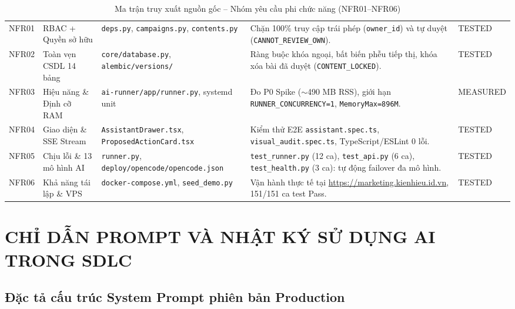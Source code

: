 \begin{table}[!htbp]
\centering
\scriptsize
\renewcommand{\arraystretch}{0.96}
\caption{Ma trận truy xuất nguồn gốc -- Nhóm yêu cầu phi chức năng (NFR01--NFR06)}\label{tab:traceability-nfr}
\begin{tabularx}{\textwidth}{|C{0.9cm}|L{2.5cm}|L{3.5cm}|Y|C{1.9cm}|}
\hline
{} &  &  &  & \\
\hline
NFR01 & RBAC + Quyền sở hữu & \texttt{deps.py}, \texttt{campaigns.py}, \texttt{contents.py} & Chặn 100\% truy cập trái phép (\texttt{owner\_id}) và tự duyệt (\texttt{CANNOT\_REVIEW\_OWN}). & TESTED\\
\hline
NFR02 & Toàn vẹn CSDL 14 bảng & \texttt{core/database.py}, \texttt{alembic/versions/} & Ràng buộc khóa ngoại, bất biến phễu tiếp thị, khóa xóa bài đã duyệt (\texttt{CONTENT\_LOCKED}). & TESTED\\
\hline
NFR03 & Hiệu năng \& Định cỡ RAM & \texttt{ai-runner/app/runner.py}, systemd unit & Đo P0 Spike ($\sim$490 MB RSS), giới hạn \texttt{RUNNER\_CONCURRENCY=1}, \texttt{MemoryMax=896M}. & MEASURED\\
\hline
NFR04 & Giao diện \& SSE Stream & \texttt{AssistantDrawer.tsx}, \texttt{ProposedActionCard.tsx} & Kiểm thử E2E \texttt{assistant.spec.ts}, \texttt{visual\_audit.spec.ts}, TypeScript/ESLint 0 lỗi. & TESTED\\
\hline
NFR05 & Chịu lỗi \& 13 mô hình AI & \texttt{runner.py}, \texttt{deploy/opencode/}\allowbreak\texttt{opencode.json} & \texttt{test\_runner.py} (12 ca), \texttt{test\_api.py} (6 ca), \texttt{test\_health.py} (3 ca): tự động failover đa mô hình. & TESTED\\
\hline
NFR06 & Khả năng tái lập \& VPS & \texttt{docker-compose.yml}, \texttt{seed\_demo.py} & Vận hành thực tế tại \url{https://marketing.kienhieu.id.vn}, 151/151 ca test Pass. & TESTED\\
\hline
\end{tabularx}
\end{table}

\chapter{CHỈ DẪN PROMPT VÀ NHẬT KÝ SỬ DỤNG AI TRONG SDLC}

\section{Đặc tả cấu trúc System Prompt phiên bản Production}

